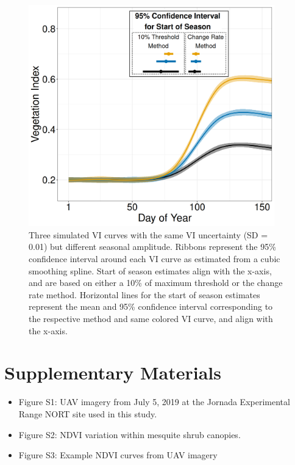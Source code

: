 \documentclass{article}
\begin{document}
\begin{figure}[h]
    \centering
    \includegraphics[width=0.95\textwidth]{figures/fig8_sos_uncertainty.png}
    \caption{Three simulated VI curves with the same VI uncertainty (SD = 0.01) but different seasonal amplitude. Ribbons represent the 95\% confidence interval around each VI curve as estimated from a cubic smoothing spline. Start of season estimates align with the x-axis, and are based on either a 10\% of maximum threshold or the change rate method.  Horizontal lines for the start of season estimates represent the mean and 95\% confidence interval corresponding to the respective method and same colored VI curve, and align with the x-axis.}
    \label{fig8}
\end{figure}

\section*{Supplementary Materials}
\begin{itemize}
    \item Figure S1: UAV imagery from July 5, 2019 at the Jornada Experimental Range NORT site used in this study.

    \item Figure S2: NDVI variation within mesquite shrub canopies.

    \item Figure S3: Example NDVI curves from UAV imagery

\end{itemize}
\end{document}
